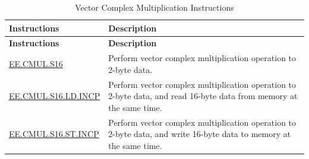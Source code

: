 \begin{longtable}[c]{|l|m{10cm}|}
    \caption{Vector Complex Multiplication Instructions}
    \label{tab:pie-complex-instructions}\\
    \hline
    \rowcolor{lightgray}
    \textbf{Instructions} & \textbf{Description} \\\hline
    \endfirsthead
    \rowcolor{lightgray}
    \textbf{Instructions} & \textbf{Description} \\\hline
    \endhead
    \endfoot
    
    \hyperref[instruction:EECMULS16]{EE.CMUL.S16} & Perform vector complex multiplication operation to 2-byte data.
    \\\hline
    \hyperref[instruction:EECMULS16LDINCP]{EE.CMUL.S16.LD.INCP} & Perform vector complex multiplication operation to 2-byte data, and read 16-byte data from memory at the same time.
    \\\hline
    \hyperref[instruction:EECMULS16STINCP]{EE.CMUL.S16.ST.INCP} & Perform vector complex multiplication operation to 2-byte data, and write 16-byte data to memory at the same time.
    \\\hline
\end{longtable}